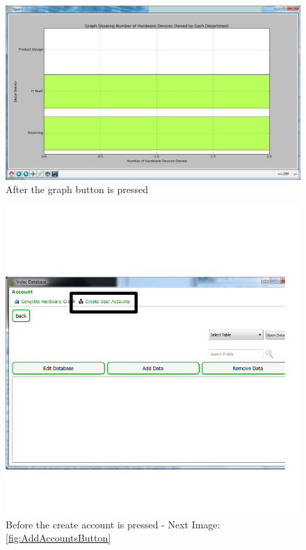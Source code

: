 \begin{figure}[H]
    \includegraphics[width=\textwidth]{./Testing/Images/GraphButton.png}
    \caption{After the graph button is pressed} \label{fig:GraphButton}
\end{figure}

\begin{figure}[H]
    \includegraphics[width=\textwidth]{./Testing/Images/AddAccountBtn.png}
    \caption{Before the create account is pressed - Next Image: \ref{fig:AddAccountsButton}} \label{fig:AddAccountsBtn}
\end{figure}

